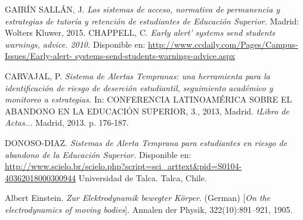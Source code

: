 
\begin{thebibliography}{}


GAIRÍN SALLÁN, J.
\textit{Los sistemas de acceso, normativa de permanencia y estrategias de tutoría y retención de estudiantes de Educación Superior.} Madrid: Wolters Kluwer, 2015.
CHAPPELL, C. 
\textit{Early alert’ systems send students warnings, advice. 2010.} Disponible en: \url{http://www.ccdaily.com/Pages/Campus-Issues/Early-alert- systems-send-students-warnings-advice.aspx}

CARVAJAL, P.
\textit{Sistema de Alertas Tempranas: una herramienta para la identificación de riesgo de deserción estudiantil, seguimiento académico y monitoreo a estrategias.} In: CONFERENCIA LATINOAMÉRICA SOBRE EL ABANDONO EN LA EDUCACIÓN SUPERIOR, 3., 2013, Madrid. \textit{tLibro de Actas...} Madrid, 2013. p. 176-187.

DONOSO-DIAZ.
\textit{Sistemas de Alerta Temprana para estudiantes en riesgo de abandono de la Educación Superior.}
Disponible en:
\url{http://www.scielo.br/scielo.php?script=sci\_arttext&pid=S0104-40362018000300944}
Universidad de Talca. Talca, Chile.

Albert Einstein. 
\textit{Zur Elektrodynamik bewegter K{\"o}rper}. (German) 
[\textit{On the electrodynamics of moving bodies}]. 
Annalen der Physik, 322(10):891–921, 1905.

\end{thebibliography}